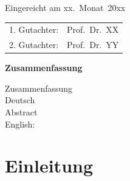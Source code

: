 \thispagestyle{empty}\vspace*{48em}

Eingereicht am xx.~Monat~20xx\vspace{1.5em}
\par{\large\begin{tabular}{ll}
 1. Gutachter: & Prof.~Dr.~XX \\
 2. Gutachter: & Prof.~Dr.~YY \\
\end{tabular}}


\newpage
\begin{center}\large\bfseries Zusammenfassung\end{center}

Zusammenfassung \\  
Deutsch \\

\vspace{20em}
Abstract \\ 
English: \\
 
 

\tableofcontents




\chapter{Einleitung}

